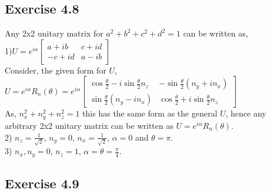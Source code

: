 \documentclass[a4paper,12pt]{article}
\begin{document}
\subsection*{Exercise 4.8}
Any 2x2 unitary matrix for $a^2+b^2+c^2+d^2=1$ can be written as,\\
1)$U=e^{i\alpha}\begin{bmatrix}
    a+ib&c+id\\
    -c+id& a-ib
\end{bmatrix}$\\
Consider, the given form for $U$,\\
$U=e^{i\alpha}R_n(\theta)=e^{i\alpha}\begin{bmatrix}
    \cos\frac{\theta}{2}-i\sin\frac{\theta}{2}n_z & -\sin\frac{\theta}{2}(n_y+in_x)\\
    \sin\frac{\theta}{2}(n_y-in_x)& \cos\frac{\theta}{2}+i\sin\frac{\theta}{2}n_z
\end{bmatrix}$\\
As, $n_x^2+n_y^2+n_z^2=1$ this has the same form as the general $U$, hence any 
arbitrary 2x2 unitary matrix can be written as $U=e^{i\alpha}R_n(\theta)$.\\
2) $n_z=\frac{1}{\sqrt{2}}$, $n_y=0$, $n_x=\frac{1}{\sqrt{2}}$,
$\alpha=0$ and $\theta=\pi$.\\
3) $n_x,n_y=0$, $n_z=1$, $\alpha =\theta=\frac{\pi}{4}$.
\subsection*{Exercise 4.9}
\end{document}
